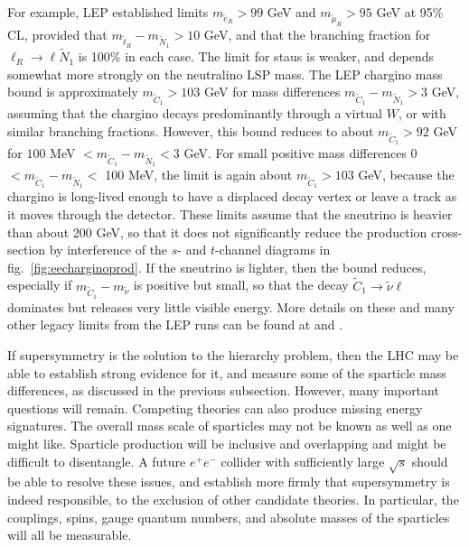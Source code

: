 \documentclass[12pt]{article}
\def\stilde{\widetilde}
\begin{document}
For example, LEP established limits $m_{\tilde e_R} > 99$ GeV and 
$m_{\tilde \mu_R} > 95$ GeV at 95\% CL, provided that $m_{\tilde \ell_R} - 
m_{\tilde N_1} > 10$ GeV, and that the branching fraction for $\ell_R 
\rightarrow \ell \stilde N_1$ is 100\% in each case. The limit for staus 
is weaker, and depends somewhat more strongly on the neutralino LSP mass.
The LEP chargino mass bound is approximately $m_{\tilde C_1} > 103$ GeV 
for mass differences $m_{\tilde C_1} - m_{\tilde N_1} > 3$ GeV, assuming 
that the chargino decays predominantly through a virtual $W$, or with 
similar branching fractions. However, this bound reduces to about 
$m_{\tilde C_1} > 92$ GeV for $100$ MeV $< m_{\tilde C_1} - m_{\tilde N_1} 
< 3$ GeV. For small positive mass differences 0 $< m_{\tilde C_1} - 
m_{\tilde N_1} <$ 100 MeV, the limit is again about $m_{\tilde C_1} > 103$ 
GeV, because the chargino is long-lived enough to have a displaced decay 
vertex or leave a track as it moves through the detector. These limits 
assume that the sneutrino is heavier than about 200 GeV, so that it does 
not significantly reduce the production cross-section by interference of 
the $s$- and $t$-channel diagrams in fig.~\ref{fig:eecharginoprod}. If the 
sneutrino is lighter, then the bound reduces, especially if $m_{\tilde C_1} - 
m_{\tilde \nu}$ is positive but small, so that the decay $\stilde C_1 
\rightarrow \tilde \nu \ell$ dominates but releases very little visible 
energy. More details on these and many other legacy limits from the LEP runs can 
be found at \cite{LEPSUSYWG} and \cite{RPP}.

If supersymmetry is the solution to the hierarchy problem, then the LHC 
may be able to establish strong evidence for it, and measure 
some of the sparticle mass differences, as discussed in the previous 
subsection. However, many important questions will remain. 
Competing theories can also produce missing energy signatures. The overall 
mass scale of sparticles may not be known as well as one might like. 
Sparticle production will be inclusive and overlapping and might be 
difficult to disentangle. A future $e^+e^-$ collider 
with sufficiently large $\sqrt{s}$
should be able to resolve these issues, and establish more firmly that 
supersymmetry is indeed responsible, to the exclusion of other 
candidate theories. In 
particular, the couplings, spins, gauge quantum numbers, and absolute 
masses of the sparticles will all be measurable.
\end{document}
